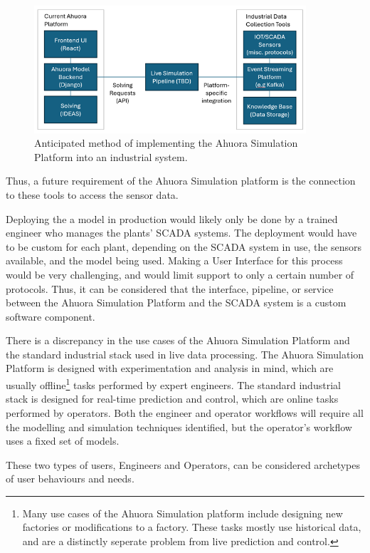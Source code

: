\begin{figure}
    \centering
    \includegraphics[width=0.9\textwidth]{architecture.png}
    \caption{Anticipated method of implementing the Ahuora Simulation Platform into an industrial system.}
    \label{fig:architecture}
\end{figure}

Thus, a future requirement of the Ahuora Simulation platform is the connection to these tools to access the sensor data. 

Deploying the a model in production would likely only be done by a trained engineer who manages the plants' SCADA systems.
The deployment would have to be custom for each plant, depending on the SCADA system in use, the sensors available, and the model being used. 
Making a User Interface for this process would be very challenging, and would limit support to only a certain number of protocols. 
Thus, it can be considered that the interface, pipeline, or service between the Ahuora Simulation Platform and the SCADA system is a custom software component. 


There is a discrepancy in the use cases of the Ahuora Simulation Platform and the standard industrial stack used in live data processing. The Ahuora Simulation Platform is designed with experimentation and analysis in mind, which are usually offline\footnote{Many use cases of the Ahuora Simulation platform include designing new factories or modifications to a factory. These tasks mostly use historical data, and are a distinctly seperate problem from live prediction and control.} tasks performed by expert engineers. 
The standard industrial stack is designed for real-time prediction and control, which are online tasks performed by operators. Both the engineer and operator workflows will require all the modelling and simulation techniques identified, but the operator's workflow uses a fixed set of models.

These two types of users, Engineers and Operators, can be considered archetypes of user behaviours and needs.

